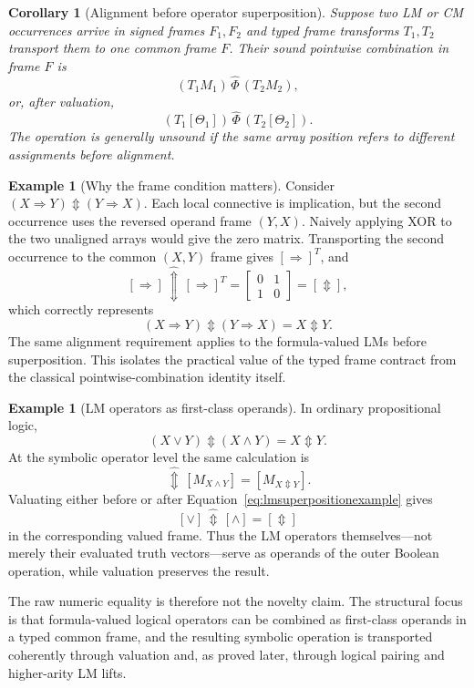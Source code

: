 \documentclass[11pt]{article}
\newtheorem{corollary}[theorem]{Corollary}
\theoremstyle{definition}
\newtheorem{example}[theorem]{Example}
\theoremstyle{remark}
\newcommand{\xor}{\mathbin{\Updownarrow}}
\begin{document}
\begin{corollary}[Alignment before operator superposition]
Suppose two LM or CM occurrences arrive in signed frames $F_1,F_2$ and typed frame transforms $T_1,T_2$ transport them to one common frame $F$.  Their sound pointwise combination in frame $F$ is
\[
 (T_1M_1)\,\widehat\Phi\,(T_2M_2),
\]
or, after valuation,
\[
 (T_1[\Theta_1])\,\widehat\Phi\,(T_2[\Theta_2]).
\]
The operation is generally unsound if the same array position refers to different assignments before alignment.
\end{corollary}

\begin{example}[Why the frame condition matters]
Consider $(X\Rightarrow Y)\xor(Y\Rightarrow X)$.  Each local connective is implication, but the second occurrence uses the reversed operand frame $(Y,X)$.  Naively applying XOR to the two unaligned arrays would give the zero matrix.  Transporting the second occurrence to the common $(X,Y)$ frame gives $[\Rightarrow]^T$, and
\[
 [\Rightarrow] \,\widehat{\Updownarrow}\, [\Rightarrow]^T
 =\begin{bmatrix}0&1\\1&0\end{bmatrix}
 =[\Updownarrow],
\]
which correctly represents
\[
 (X\Rightarrow Y)\xor(Y\Rightarrow X)=X\xor Y.
\]
The same alignment requirement applies to the formula-valued LMs before superposition.  This isolates the practical value of the typed frame contract from the classical pointwise-combination identity itself.
\end{example}

\begin{example}[LM operators as first-class operands]
In ordinary propositional logic,
\[
 (X\lor Y)\xor(X\land Y)=X\xor Y.
\]
At the symbolic operator level the same calculation is
\begin{equation}
 [M_{X\lor Y}]\,\widehat{\Updownarrow}\,[M_{X\land Y}]
 =[M_{X\Updownarrow Y}].
 \label{eq:lmsuperpositionexample}
\end{equation}
Valuating either before or after Equation~\eqref{eq:lmsuperpositionexample} gives
\[
 [\lor] \,\widehat{\Updownarrow}\, [\land]=[\Updownarrow]
\]
in the corresponding valued frame.  Thus the LM operators themselves---not merely their evaluated truth vectors---serve as operands of the outer Boolean operation, while valuation preserves the result.
\end{example}

The raw numeric equality is therefore not the novelty claim.  The structural focus is that formula-valued logical operators can be combined as first-class operands in a typed common frame, and the resulting symbolic operation is transported coherently through valuation and, as proved later, through logical pairing and higher-arity LM lifts.
\end{document}
